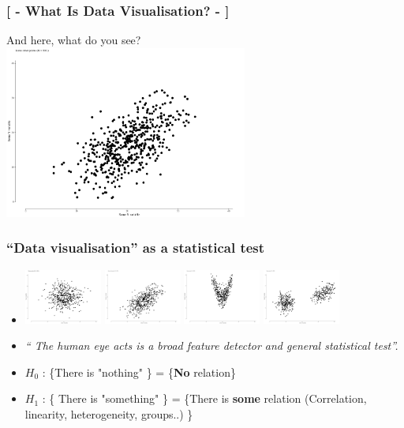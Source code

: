 \documentclass[xcolor=x11names,compress, aspectratio=169]{beamer}
\renewcommand{\(}{\begin{columns}}
\renewcommand{\)}{\end{columns}}
\newcommand{\<}[1]{\begin{column}{#1}}
\renewcommand{\>}{\end{column}}
\begin{document}
\begin{frame} %
\frametitle{\textcolor{brique}{[ - What Is Data Visualisation? - ]}}
 \begin{center}
 And here, what do you see?\\
  \includegraphics[width = 0.6\textwidth]{LinearPoints1.pdf}
\end{center}
\end{frame}

\begin{frame} %
\frametitle{``Data visualisation'' as a statistical test }
 \begin{itemize}
  \item<+->[] \includegraphics[width = 0.2\textwidth]{RandomPoints.pdf}
            \includegraphics[width = 0.2\textwidth]{LinearPoints1.pdf}
            \includegraphics[width = 0.2\textwidth]{UshapedPoints.pdf}
            \includegraphics[width = 0.2\textwidth]{GroupsPoints.pdf}
  \item<+->[] {\centering \textit{`` The human eye acts is a broad feature detector and general statistical test''. \cite{Buja2009}}}
  \item<+->[\textbf{Test:}] $H_0$ : \{There is "nothing"  \} = \{\textbf{No} relation\}
  \item<+->[] $H_1$ : \{ There is "something" \} = \{There is \textbf{some} relation (Correlation, linearity, heterogeneity, groups..) \}
 \end{itemize}
\end{frame}
\end{document}
